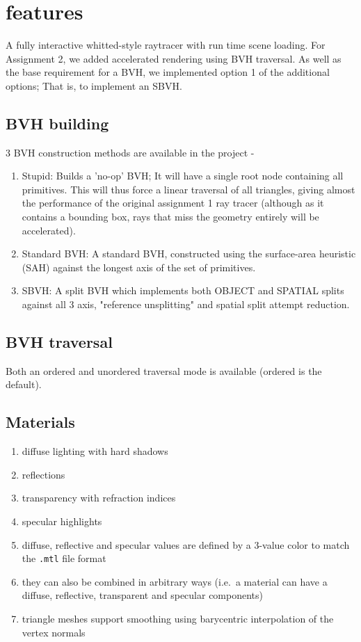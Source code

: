 \section{features}
A fully interactive whitted-style raytracer with run time scene loading. 
For Assignment 2, we added accelerated rendering using BVH traversal. As well as the base requirement for a BVH, we implemented option 1 of the additional options; That is, to implement an SBVH.

\subsection{BVH building}
3 BVH construction methods are available in the project -
    \begin{enumerate}
        \item Stupid: Builds a 'no-op' BVH; It will have a single root node containing all primitives. This will thus force a linear traversal of all triangles, giving almost the performance of the original assignment 1 ray tracer (although as it contains a bounding box, rays that miss the geometry entirely will be accelerated).
        \item Standard BVH: A standard BVH, constructed using the surface-area heuristic (SAH) against the longest axis of the set of primitives.
        \item SBVH: A split BVH which implements both OBJECT and SPATIAL splits against all 3 axis, "reference unsplitting" and spatial split attempt reduction.
    \end{enumerate}

\subsection{BVH traversal}
Both an ordered and unordered traversal mode is available (ordered is the default).
\subsection{Materials}
    \begin{enumerate}
    \item diffuse lighting with hard shadows
    \item reflections
    \item transparency with refraction indices
    \item specular highlights
    \item diffuse, reflective and specular values are defined by a 3-value color to match the \verb|.mtl| file format
    \item they can also be combined in arbitrary ways (i.e.\ a material can have a diffuse, reflective, transparent and specular components)
    \item triangle meshes support smoothing using barycentric interpolation of the vertex normals
    \end{enumerate}

